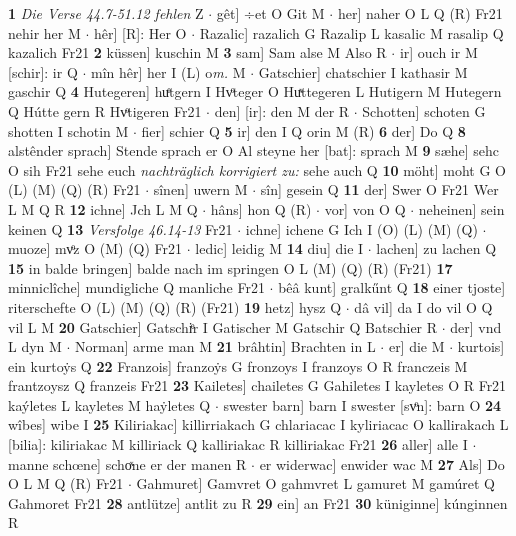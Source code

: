 \documentclass[8pt,a4paper,notitlepage]{article}
\begin{document}
\begin{table}[ht]
\begin{minipage}[t]{0.5\linewidth}
\textbf{1} \textit{Die Verse 44.7-51.12 fehlen} Z   $\cdot$ gêt] ÷et O Git M  $\cdot$ her] naher O L Q (R) Fr21 nehir her M  $\cdot$ hêr] [R]: Her O  $\cdot$ Razalic] razalich G Razalip L kasalic M rasalip Q kazalich Fr21 \textbf{2} küssen] kuschin M \textbf{3} sam] Sam alse M Also R  $\cdot$ ir] ouch ir M [schir]: ir Q  $\cdot$ mîn hêr] her I (L) o\textit{m. } M  $\cdot$ Gatschier] chatschier I kathasir M gaschir Q \textbf{4} Hutegeren] huͤtgern I Hvͦteger O Huͯttegeren L Hutigern M Hutegern Q Hútte gern R Hvͦtigeren Fr21  $\cdot$ den] [ir]: den M der R  $\cdot$ Schotten] schoten G shotten I schotin M  $\cdot$ fier] schier Q \textbf{5} ir] den I Q orin M (R) \textbf{6} der] Do Q \textbf{8} alstênder sprach] Stende sprach er O Al steyne her [bat]: sprach M \textbf{9} sæhe] sehc O sih Fr21 sehe euch \textit{nachträglich korrigiert zu:} sehe auch Q \textbf{10} möht] moht G O (L) (M) (Q) (R) Fr21  $\cdot$ sînen] uwern M  $\cdot$ sîn] gesein Q \textbf{11} der] Swer O Fr21 Wer L M Q R \textbf{12} ichne] Jch L M Q  $\cdot$ hâns] hon Q (R)  $\cdot$ vor] von O Q  $\cdot$ neheinen] sein keinen Q \textbf{13} \textit{Versfolge 46.14-13} Fr21   $\cdot$ ichne] ichene G Ich I (O) (L) (M) (Q)  $\cdot$ muoze] mvͦz O (M) (Q) Fr21  $\cdot$ ledic] leidig M \textbf{14} diu] die I  $\cdot$ lachen] zu lachen Q \textbf{15} in balde bringen] balde nach im springen O L (M) (Q) (R) (Fr21) \textbf{17} minniclîche] mundigliche Q manliche Fr21  $\cdot$ bêâ kunt] gralkűnt Q \textbf{18} einer tjoste] riterschefte O (L) (M) (Q) (R) (Fr21) \textbf{19} hetz] hysz Q  $\cdot$ dâ vil] da I do vil O Q vil L M \textbf{20} Gatschier] Gatschiͤr I Gatischer M Gatschir Q Batschier R  $\cdot$ der] vnd L dyn M  $\cdot$ Norman] arme man M \textbf{21} brâhtin] Brachten in L  $\cdot$ er] die M  $\cdot$ kurtois] ein kurtoẏs Q \textbf{22} Franzois] franzoẏs G fronzoys I franzoys O R franczeis M frantzoysz Q franzeis Fr21 \textbf{23} Kailetes] chailetes G Gahiletes I kayletes O R Fr21 kaýletes L kayletes M haẏletes Q  $\cdot$ swester barn] barn I swester [svͦn]: barn O \textbf{24} wîbes] wibe I \textbf{25} Kiliriakac] killirriakach G chlariacac I kyliriacac O kallirakach L [bilia]: kiliriakac M killiriack Q kalliriakac R killiriakac Fr21 \textbf{26} aller] alle I  $\cdot$ manne schœne] schoͯne er der manen R  $\cdot$ er widerwac] enwider wac M \textbf{27} Als] Do O L M Q (R) Fr21  $\cdot$ Gahmuret] Gamvret O gahmvret L gamuret M gamúret Q Gahmoret Fr21 \textbf{28} antlütze] antlit zu R \textbf{29} ein] an Fr21 \textbf{30} küniginne] kúnginnen R \newline
\end{minipage}

\end{table}
\end{document}
